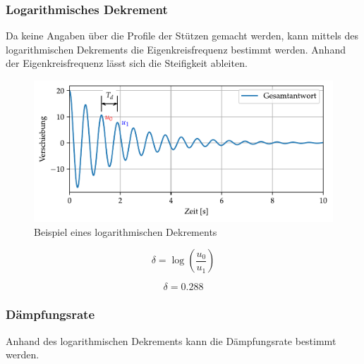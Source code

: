 \documentclass[
  letterpaper,
  DIV=11]{scrreprt}
\begin{document}
\hypertarget{logarithmisches-dekrement}{%
\subsubsection{Logarithmisches
Dekrement}\label{logarithmisches-dekrement}}

Da keine Angaben über die Profile der Stützen gemacht werden, kann
mittels des logarithmischen Dekrements die Eigenkreisfrequenz bestimmt
werden. Anhand der Eigenkreisfrequenz lässt sich die Steifigkeit
ableiten.

\begin{figure}[H]

{\centering \includegraphics{index_files/mediabag/ems_01_files/figure-pdf/fig-ems_log_dek_zerfall-output-1.pdf}

}

\caption{\label{fig-ems_log_dek_zerfall}Beispiel eines logarithmischen
Dekrements}

\end{figure}

\begin{equation}\delta = \log{\left(\frac{u_{0}}{u_{1}} \right)}\end{equation}

\begin{equation}\delta = 0.288\end{equation}

\hypertarget{duxe4mpfungsrate}{%
\subsubsection{Dämpfungsrate}\label{duxe4mpfungsrate}}

Anhand des logarithmischen Dekrements kann die Dämpfungsrate bestimmt
werden.
\end{document}
